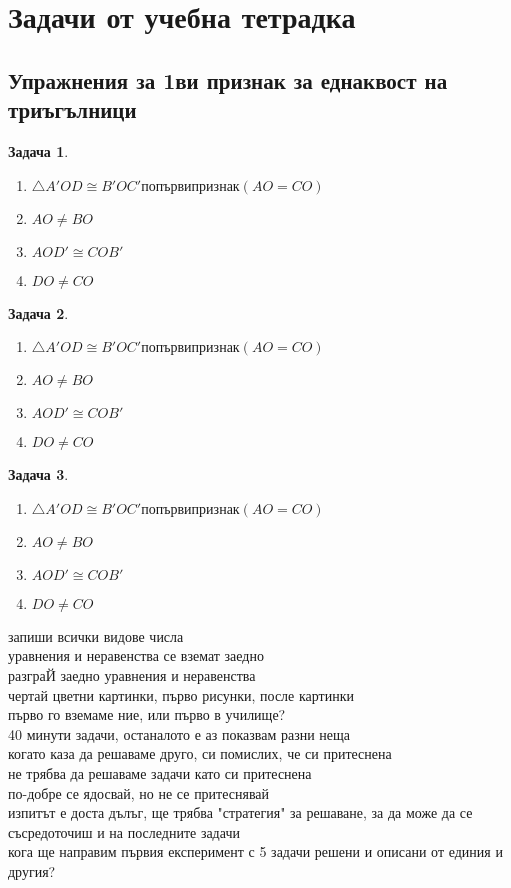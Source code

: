 \documentclass{article}
\newtheorem{problem}{Задача}
\begin{document}
\section{Задачи от учебна тетрадка}
\subsection{Упражнения за 1ви признак за еднаквост на триъгълници }	

\begin{problem}
	\begin{enumerate}
		\item 	$\triangle A'OD \cong B'OC' по първи признак(AO =CO ) $
		\item $AO \neq BO$ 
		\item $AOD' \cong COB'$
		\item $DO \neq CO$
	\end{enumerate}

\end{problem}


\begin{problem}
	\begin{enumerate}
		\item 	$\triangle A'OD \cong B'OC' по първи признак(AO =CO ) $
		\item $AO \neq BO$ 
		\item $AOD' \cong COB'$
		\item $DO \neq CO$
	\end{enumerate}
	
\end{problem}


\begin{problem}
	\begin{enumerate}
		\item 	$\triangle A'OD \cong B'OC' по първи признак(AO =CO ) $
		\item $AO \neq BO$ 
		\item $AOD' \cong COB'$
		\item $DO \neq CO$
	\end{enumerate}
	
\end{problem}
запиши всички видове числа \\
уравнения и неравенства се вземат заедно \\
разграЙ заедно уравнения и неравенства \\
чертай цветни картинки, първо рисунки, после картинки\\
първо го вземаме ние, или първо в училище?\\
40 минути задачи, останалото е аз показвам разни неща\\
когато каза да решаваме друго, си помислих, че си притеснена\\
не трябва да решаваме задачи като си притеснена\\
по-добре се ядосвай, но не се притеснявай\\
изпитът е доста дълъг, ще трябва "стратегия" за решаване, за да може да се съсредоточиш и на последните задачи \\
кога ще направим първия експеримент с 5 задачи решени и описани от единия и другия?\\
\end{document}
